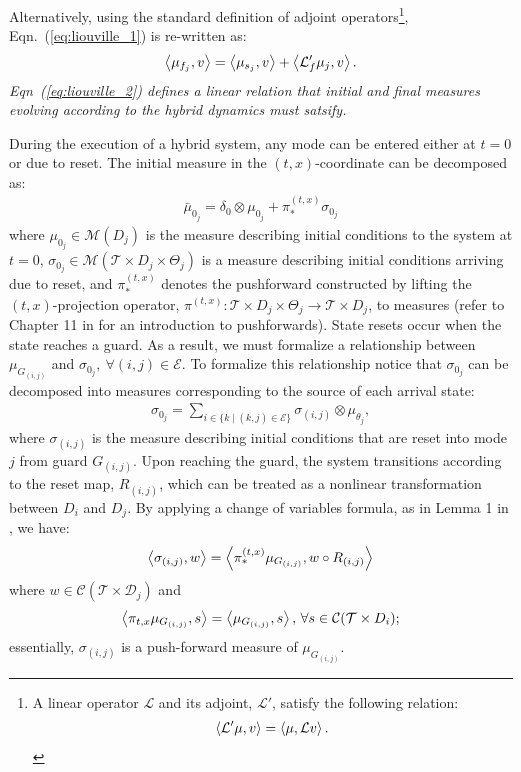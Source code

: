 Alternatively, using the standard definition of adjoint operators\footnote{A linear operator $\mathcal L$ and its adjoint, $\mathcal L'$, satisfy the following relation:
\begin{align*}
    \left\langle \mathcal L'\mu,v\right\rangle=\left\langle \mu,\mathcal Lv\right\rangle.
\end{align*}
}, Eqn.~(\ref{eq:liouville_1}) is re-written as:
\begin{align}
\left\langle \mu_{f_j},v\right\rangle=\left\langle \mu_{s_j},v\right\rangle+\left\langle \mathcal L'_{f}\mu_{j},v\right\rangle.
  \label{eq:liouville_2}
\end{align}
\emph{Eqn~(\ref{eq:liouville_2}) defines a linear relation that initial and final measures evolving according to the hybrid dynamics must satsify.}


During the execution of a hybrid system, any mode can be entered either at $t=0$ or due to reset.
The initial measure in the $(t,x)$-coordinate can be decomposed as:
\begin{align}
  \bar\mu_{0_j}=\delta_0\otimes\mu_{0_j}+\pi^{(t,x)}_*\sigma_{0_j}
\end{align}
where $\mu_{0_j}\in \mathcal M(D_j)$ is the measure describing initial conditions to the system at $t=0$, $\sigma_{0_j}\in \mathcal M(\mathcal T\times D_j\times \Theta_j)$ is a measure describing initial conditions arriving due to reset, and $\pi^{(t,x)}_*$ denotes the pushforward constructed by lifting the $(t,x)$-projection operator, $\pi^{(t,x)}: \mathcal T\times D_j\times \Theta_j \to \mathcal T\times D_j$, to measures (refer to Chapter 11 in \cite{lee2003smooth} for an introduction to pushforwards). 
State resets occur when the state reaches a guard. 
As a result, we must formalize a relationship between $\mu_{ G_{(i,j)}}$ and $\sigma_{0_j},~\forall (i,j)\in \mathcal E$.
To formalize this relationship notice that $\sigma_{0_j}$ can be decomposed into measures corresponding to the source of each arrival state:
\begin{align}
  \sigma_{0_j}=\sum_{i\in \{k\mid (k,j)\in \mathcal E\}} \sigma_{(i,j)}\otimes \mu_{\theta_j},
\end{align}
where $\sigma_{(i,j)}$ is the measure describing initial conditions that are reset into mode $j$ from guard $G_{(i,j)}$.
Upon reaching the guard, the system transitions according to the reset map, $R_{(i,j)}$, which can be treated as a nonlinear transformation between $D_i$ and $D_j$.
By applying a change of variables formula, as in Lemma 1 in \cite{shia2014convex}, we have:
\begin{align}
    \left\langle \sigma_{(i,j)},w\right\rangle=\left\langle \pi^{(t,x)}_*\mu_{ G_{(i,j)}},w\circ R_{(i,j)}\right\rangle
    \label{eq:reset_measure}
\end{align}
where $w\in \mathcal C(\mathcal T\times \mathcal D_j)$ and
$$
  \left\langle \pi_{t,x}\mu_{ G_{(i,j)}},s\right\rangle=\left\langle \mu_{ G_{(i,j)}},s\right\rangle,\,\forall s\in \mathcal C(\mathcal T\times D_i);
$$
essentially, $\sigma_{(i,j)}$ is a push-forward measure of $\mu_{ G_{(i,j)}}$.
